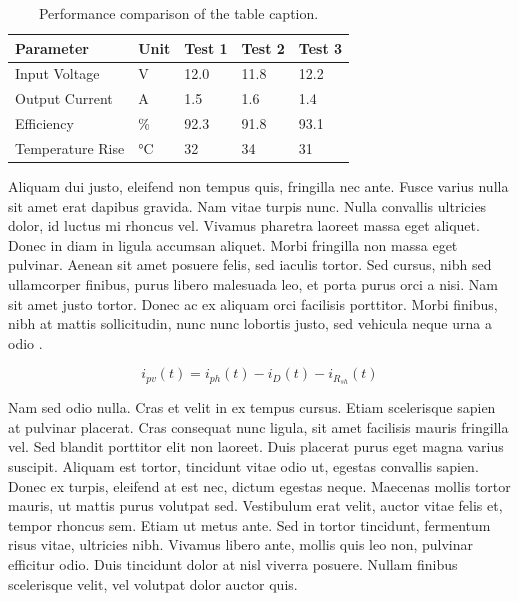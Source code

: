     \begin{table}[ht]
    \centering
        \begin{tabular}{|l|l|l|l|l|}
            \hline
            \textbf{Parameter} & \textbf{Unit} & \textbf{Test 1} & \textbf{Test 2} & \textbf{Test 3} \\ \hline
            Input Voltage      & V             & 12.0            & 11.8            & 12.2            \\ \hline
            Output Current     & A             & 1.5             & 1.6             & 1.4             \\ \hline
            Efficiency         & \%            & 92.3            & 91.8            & 93.1            \\ \hline
            Temperature Rise   & °C            & 32              & 34              & 31              \\ \hline
        \end{tabular}
        \caption{Performance comparison of the table caption.}
        \label{tab:placeholder_table}
    \end{table}

Aliquam dui justo, eleifend non tempus quis, fringilla nec ante. Fusce varius nulla sit amet erat dapibus gravida. Nam vitae turpis nunc. Nulla convallis ultricies dolor, id luctus mi rhoncus vel. Vivamus pharetra laoreet massa eget aliquet. Donec in diam in ligula accumsan aliquet. Morbi fringilla non massa eget pulvinar. Aenean sit amet posuere felis, sed iaculis tortor. Sed cursus, nibh sed ullamcorper finibus, purus libero malesuada leo, et porta purus orci a nisi. Nam sit amet justo tortor. Donec ac ex aliquam orci facilisis porttitor. Morbi finibus, nibh at mattis sollicitudin, nunc nunc lobortis justo, sed vehicula neque urna a odio .

    \begin{equation}
        i_{pv}(t) = i_{ph}(t) - i_{D}(t) - i_{R_{sh}}(t)
        \label{eq:placeholder_equation}
    \end{equation}

Nam sed odio nulla. Cras et velit in ex tempus cursus. Etiam scelerisque sapien at pulvinar placerat. Cras consequat nunc ligula, sit amet facilisis mauris fringilla vel. Sed blandit porttitor elit non laoreet. Duis placerat purus eget magna varius suscipit. Aliquam est tortor, tincidunt vitae odio ut, egestas convallis sapien. Donec ex turpis, eleifend at est nec, dictum egestas neque. Maecenas mollis tortor mauris, ut mattis purus volutpat sed. Vestibulum erat velit, auctor vitae felis et, tempor rhoncus sem. Etiam ut metus ante. Sed in tortor tincidunt, fermentum risus vitae, ultricies nibh. Vivamus libero ante, mollis quis leo non, pulvinar efficitur odio. Duis tincidunt dolor at nisl viverra posuere. Nullam finibus scelerisque velit, vel volutpat dolor auctor quis.